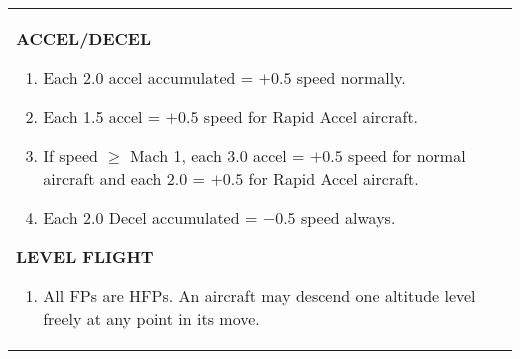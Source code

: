 
\begin{twocolumntablefloat}
\begin{twocolumntable}

\newcommand{\heading}[1]{\medskip\par\textbf{\MakeUppercase{#1}}\par\smallskip}
\newcommand{\subheading}[1]{\smallskip\par\textbf{#1}\par\smallskip}

\footnotesize
\begin{tabularx}{\linewidth}{P}
\toprule
\begin{multicols}{2}

\heading{Accel/Decel}
\begin{enumerate}[nosep]
    \item Each 2.0 accel accumulated = $+0.5$ speed normally.
    \item Each 1.5 accel = $+0.5$ speed for Rapid Accel aircraft.
    \item If speed $\ge$ Mach 1, each 3.0 accel = $+0.5$ speed for normal aircraft and each 2.0 = $+0.5$ for Rapid Accel aircraft.
    \item Each 2.0 Decel accumulated = $-0.5$ speed always.
\end{enumerate}

\heading{Level Flight}
\begin{enumerate}[nosep]
    \item All FPs are HFPs. An aircraft may descend one altitude level freely at any point in its move.
\end{enumerate}


\end{multicols}
\end{tabularx}
\end{twocolumntable}
\end{twocolumntablefloat}

